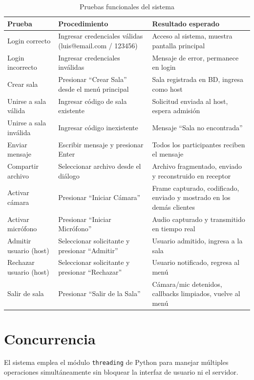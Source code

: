 \documentclass[12pt,a4paper]{article}
\begin{document}
\begin{table}[H]
\centering
\small
\begin{tabular}{p{4.5cm}p{5cm}p{5cm}}
\toprule
\textbf{Prueba} & \textbf{Procedimiento} & \textbf{Resultado esperado} \\
\midrule
Login correcto & Ingresar credenciales v\'alidas (luis@email.com / 123456) & Acceso al sistema, muestra pantalla principal \\
Login incorrecto & Ingresar credenciales inv\'alidas & Mensaje de error, permanece en login \\
Crear sala & Presionar ``Crear Sala'' desde el men\'u principal & Sala registrada en BD, ingresa como host \\
Unirse a sala v\'alida & Ingresar c\'odigo de sala existente & Solicitud enviada al host, espera admisi\'on \\
Unirse a sala inv\'alida & Ingresar c\'odigo inexistente & Mensaje ``Sala no encontrada'' \\
Enviar mensaje & Escribir mensaje y presionar Enter & Todos los participantes reciben el mensaje \\
Compartir archivo & Seleccionar archivo desde el di\'alogo & Archivo fragmentado, enviado y reconstruido en receptor \\
Activar c\'amara & Presionar ``Iniciar C\'amara'' & Frame capturado, codificado, enviado y mostrado en los dem\'as clientes \\
Activar micr\'ofono & Presionar ``Iniciar Micr\'ofono'' & Audio capturado y transmitido en tiempo real \\
Admitir usuario (host) & Seleccionar solicitante y presionar ``Admitir'' & Usuario admitido, ingresa a la sala \\
Rechazar usuario (host) & Seleccionar solicitante y presionar ``Rechazar'' & Usuario notificado, regresa al men\'u \\
Salir de sala & Presionar ``Salir de la Sala'' & C\'amara/mic detenidos, callbacks limpiados, vuelve al men\'u \\
\bottomrule
\end{tabular}
\caption{Pruebas funcionales del sistema}
\end{table}

\section{Concurrencia}

El sistema emplea el m\'odulo \texttt{threading} de Python para manejar m\'ultiples operaciones simult\'aneamente sin bloquear la interfaz de usuario ni el servidor.
\end{document}
